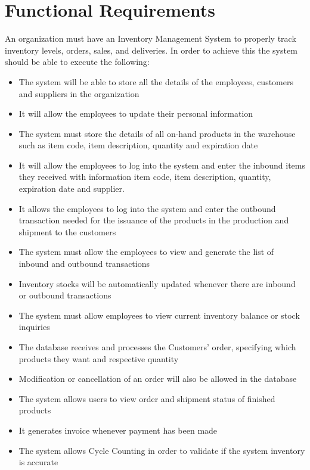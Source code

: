 \section{Functional Requirements}

An organization must have an Inventory Management System to properly track inventory levels, orders, sales, and deliveries. In order to achieve this the system should be able to execute the following:

\begin{itemize}
    \item The system will be able to store all the details of the employees, customers and suppliers in the organization
    \item It will allow the employees to update their personal information
    \item The system must store the details of all on-hand products in the warehouse such as item code, item description, quantity and expiration date
    \item It will allow the employees to log into the system and enter the inbound items they received with information item code, item description, quantity, expiration date and supplier. 
    \item It allows the employees to log into the system and enter the outbound transaction needed for the issuance of the products in the production and shipment to the customers
    \item The system must allow the employees to view and generate the list of inbound and outbound transactions
    \item Inventory stocks will be automatically updated whenever there are inbound or outbound transactions 
    \item The system must allow employees to view current inventory balance or stock inquiries
    \item The database receives and processes the Customers' order, specifying which products they want and respective quantity
    \item Modification or cancellation of an order will also be allowed in the database
    \item The system allows users to view order and shipment status of finished products
    \item It generates invoice whenever payment has been made
    \item The system allows Cycle Counting in order to validate if the system inventory is accurate
\end{itemize}